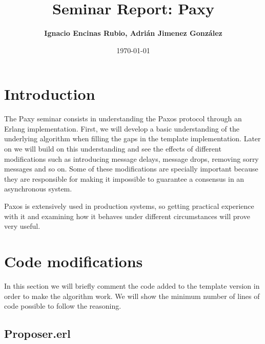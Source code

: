 \documentclass[a4paper, 10pt]{article}
\title{Seminar Report: Paxy}
\author{\textbf{Ignacio Encinas Rubio, Adrián Jimenez González}}
\date{\normalsize\today{}}
\begin{document}
\maketitle

  
  

\section{Introduction}

The Paxy seminar consists in understanding the Paxos protocol through an Erlang implementation. First, we will develop a basic understanding of the underlying algorithm when filling the gaps in the template implementation. Later on we will build on this understanding and see the effects of different modifications such as introducing message delays, message drops, removing sorry messages and so on. Some of these modifications are specially important because they are responsible for making it impossible to guarantee a consensus in an asynchronous system.

Paxos is extensively used in production systems, so getting practical experience with it and examining how it behaves under different circumstances will prove very useful.


\section{Code modifications}

   In this section we will briefly comment the code added to the template version in order to
   make the algorithm work. We will show the minimum number of lines of code possible to follow the reasoning.

  \subsection{Proposer.erl}
\end{document}

